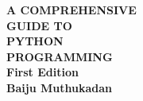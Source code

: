 
\begin{titlepage}


\vspace*{15mm}


\begin{center}

\uppercase{\fontsize{28}{28}\sf\bfseries A Comprehensive\\[.3in] Guide to}\\[.3in]
\uppercase{\fontsize{49}{35}\sf\bfseries Python}\\[.3in]
\uppercase{\fontsize{42}{35}\sf\bfseries Programming}\\[.3in]


{\fontsize{21}{21}\sf\bfseries First Edition}\\[.7in]

{\fontsize{28}{28}\sf\bfseries Baiju Muthukadan}


\end{center}

\end{titlepage}
